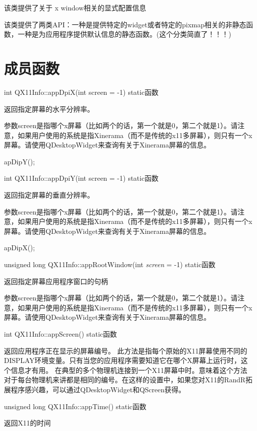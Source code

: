 该类提供了关于 x window相关的显式配置信息

该类提供了两类API：一种是提供特定的widget或者特定的pixmap相关的非静态函数，一种是为应用程序提供默认信息的静态函数。(这个分类简直了！！！)

\section{成员函数}

int QX11Info::appDpiX(int screen = -1) static函数

返回指定屏幕的水平分辨率。

参数screen是指哪个x屏幕（比如两个的话，第一个就是0，第二个就是1）。请注意，如果用户使用的系统是指Xinerama（而不是传统的x11多屏幕），则只有一个x屏幕。请使用QDesktopWidget来查询有关于Xinerama屏幕的信息。

\begin{seeAlso}
apDipY();
\end{seeAlso}

int QX11Info::appDpiY(int screen = -1) static函数

返回指定屏幕的垂直分辨率。

参数screen是指哪个x屏幕（比如两个的话，第一个就是0，第二个就是1）。请注意，如果用户使用的系统是指Xinerama（而不是传统的x11多屏幕），则只有一个x屏幕。请使用QDesktopWidget来查询有关于Xinerama屏幕的信息。

\begin{seeAlso}
apDipX();
\end{seeAlso}

unsigned long QX11Info::appRootWindow(int \emph{screen} = -1) static函数

返回指定屏幕应用程序窗口的句柄

参数screen是指哪个x屏幕（比如两个的话，第一个就是0，第二个就是1）。请注意，如果用户使用的系统是指Xinerama（而不是传统的x11多屏幕），则只有一个x屏幕。请使用QDesktopWidget来查询有关于Xinerama屏幕的信息。

int QX11Info::appScreen() static函数

返回应用程序正在显示的屏幕编号。 此方法是指每个原始的X11屏幕使用不同的DISPLAY环境变量。只有当您的应用程序需要知道它在哪个X屏幕上运行时，这个信息才有用。 在典型的多个物理机连接到一个X11屏幕中时。意味着这个方法对于每台物理机来讲都是相同的编号。在这样的设置中，如果您对X11的RandR拓展程序感兴趣，可以通过QDesktopWidget和QScreen获得。

unsigned long QX11Info::appTime() static函数

返回X11的时间

